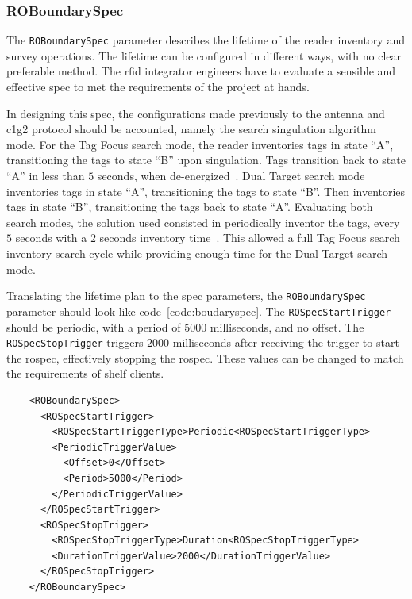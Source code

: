 \subsubsection{ROBoundarySpec}

The \texttt{ROBoundarySpec} parameter describes the lifetime of the reader inventory and survey operations.
The lifetime can be configured in different ways, with no clear preferable method. The \ac{rfid} integrator engineers have to evaluate a sensible and effective \ac{spec} to met the requirements of the project at hands.

In designing this \ac{spec}, the configurations made previously to the antenna and \ac{c1g2} protocol should be accounted, namely the search singulation algorithm mode.
For the Tag Focus search mode, the reader inventories tags in state ``A'', transitioning the tags to state ``B'' upon singulation. Tags transition back to state ``A'' in less than $5$ seconds, when de-energized~\cite{ImpinjOctaneLLRP}.
Dual Target search mode inventories tags in state ``A'', transitioning the tags to state ``B''. Then inventories tags in state ``B'', transitioning the tags back to state ``A''.
Evaluating both search modes, the solution used consisted in periodically inventor the tags, every $5$ seconds with a $2$ seconds inventory time~\cite{ImpinjOctaneLLRP, UnderstandingEPCGen2}.
This allowed a full Tag Focus search inventory search cycle while providing enough time for the Dual Target search mode.

Translating the lifetime plan to the \ac{spec} parameters, the \texttt{ROBoundarySpec} parameter should look like code~\ref{code:boudaryspec}. The \texttt{ROSpecStartTrigger} should be periodic, with a period of $5000$ milliseconds, and no offset. The \texttt{ROSpecStopTrigger} triggers $2000$ milliseconds after receiving the trigger to start the \ac{rospec}, effectively stopping the \ac{rospec}.
These values can be changed to match the requirements of shelf clients.

\begin{listing}
    \begin{verbatim}
    <ROBoundarySpec>
      <ROSpecStartTrigger>
        <ROSpecStartTriggerType>Periodic<ROSpecStartTriggerType>
        <PeriodicTriggerValue>
          <Offset>0</Offset>
          <Period>5000</Period>
        </PeriodicTriggerValue>
      </ROSpecStartTrigger>
      <ROSpecStopTrigger>
        <ROSpecStopTriggerType>Duration<ROSpecStopTriggerType>
        <DurationTriggerValue>2000</DurationTriggerValue>
      </ROSpecStopTrigger>
    </ROBoundarySpec>
    \end{verbatim}
    \caption{}
    \label{code:boudaryspec}
\end{listing}

